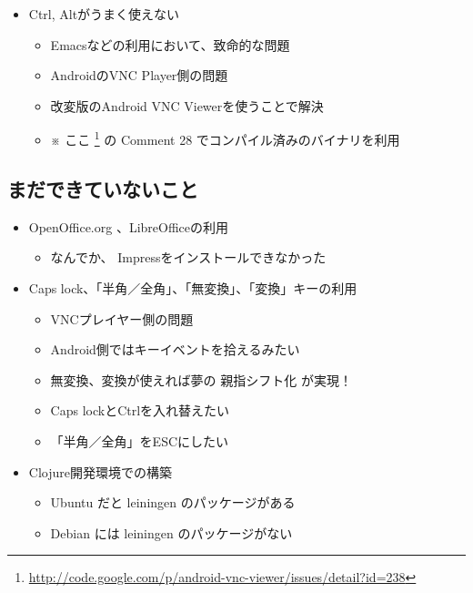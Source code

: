 \documentclass[mingoth,a4paper]{jsarticle}
\begin{document}
\begin{itemize}
\begin{itemize}
       \end{itemize}
 \item Ctrl, Altがうまく使えない
       \begin{itemize}
        \item Emacsなどの利用において、致命的な問題
        \item AndroidのVNC Player側の問題
        \item 改変版のAndroid VNC Viewerを使うことで解決
        \item ※ ここ
              \footnote{\url{http://code.google.com/p/android-vnc-viewer/issues/detail?id=238}}
              の Comment 28 でコンパイル済みのバイナリを利用
       \end{itemize}
\end{itemize}

\subsection{まだできていないこと}
\begin{itemize}
 \item OpenOffice.org 、LibreOfficeの利用
      \begin{itemize}
       \item なんでか、 Impressをインストールできなかった
      \end{itemize}
 \item Caps lock、「半角／全角」、「無変換」、「変換」キーの利用
       \begin{itemize}
        \item VNCプレイヤー側の問題
        \item Android側ではキーイベントを拾えるみたい
        \item 無変換、変換が使えれば夢の 親指シフト化 が実現！
        \item Caps lockとCtrlを入れ替えたい
        \item 「半角／全角」をESCにしたい
       \end{itemize}
 \item Clojure開発環境での構築
       \begin{itemize}
        \item Ubuntu だと leiningen のパッケージがある
        \item Debian には leiningen のパッケージがない
       \end{itemize}
\end{itemize}
\end{document}
